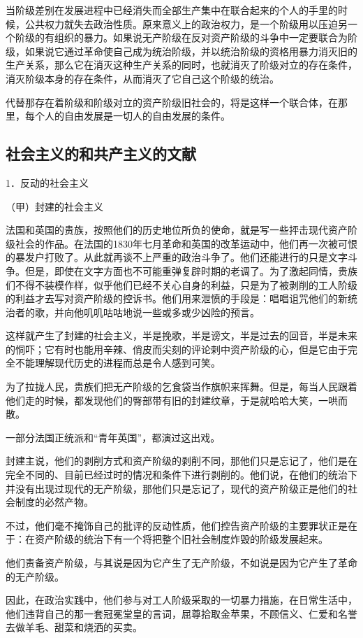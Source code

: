     当阶级差别在发展进程中已经消失而全部生产集中在联合起来的个人的手里的时候，公共权力就失去政治性质。原来意义上的政治权力，是一个阶级用以压迫另一个阶级的有组织的暴力。如果说无产阶级在反对资产阶级的斗争中一定要联合为阶级，如果说它通过革命使自己成为统治阶级，并以统治阶级的资格用暴力消灭旧的生产关系，那么它在消灭这种生产关系的同时，也就消灭了阶级对立的存在条件，消灭阶级本身的存在条件，从而消灭了它自己这个阶级的统治。

    代替那存在着阶级和阶级对立的资产阶级旧社会的，将是这样一个联合体，在那里，每个人的自由发展是一切人的自由发展的条件。
    \subsection{社会主义的和共产主义的文献}
    1．反动的社会主义

    （甲）封建的社会主义

    法国和英国的贵族，按照他们的历史地位所负的使命，就是写一些抨击现代资产阶级社会的作品。在法国的1830年七月革命和英国的改革运动中，他们再一次被可恨的暴发户打败了。从此就再谈不上严重的政治斗争了。他们还能进行的只是文字斗争。但是，即使在文字方面也不可能重弹复辟时期的老调了。为了激起同情，贵族们不得不装模作样，似乎他们已经不关心自身的利益，只是为了被剥削的工人阶级的利益才去写对资产阶级的控诉书。他们用来泄愤的手段是：唱唱诅咒他们的新统治者的歌，并向他叽叽咕咕地说一些或多或少凶险的预言。

    这样就产生了封建的社会主义，半是挽歌，半是谤文，半是过去的回音，半是未来的恫吓；它有时也能用辛辣、俏皮而尖刻的评论剌中资产阶级的心，但是它由于完全不能理解现代历史的进程而总是令人感到可笑。

    为了拉拢人民，贵族们把无产阶级的乞食袋当作旗帜来挥舞。但是，每当人民跟着他们走的时候，都发现他们的臀部带有旧的封建纹章，于是就哈哈大笑，一哄而散。

    一部分法国正统派和“青年英国”，都演过这出戏。

    封建主说，他们的剥削方式和资产阶级的剥削不同，那他们只是忘记了，他们是在完全不同的、目前已经过时的情况和条件下进行剥削的。他们说，在他们的统治下并没有出现过现代的无产阶级，那他们只是忘记了，现代的资产阶级正是他们的社会制度的必然产物。

    不过，他们毫不掩饰自己的批评的反动性质，他们控告资产阶级的主要罪状正是在于：在资产阶级的统治下有一个将把整个旧社会制度炸毁的阶级发展起来。

    他们责备资产阶级，与其说是因为它产生了无产阶级，不如说是因为它产生了革命的无产阶级。

    因此，在政治实践中，他们参与对工人阶级采取的一切暴力措施，在日常生活中，他们违背自己的那一套冠冕堂皇的言词，屈尊拾取金苹果，不顾信义、仁爱和名誉去做羊毛、甜菜和烧洒的买卖。

